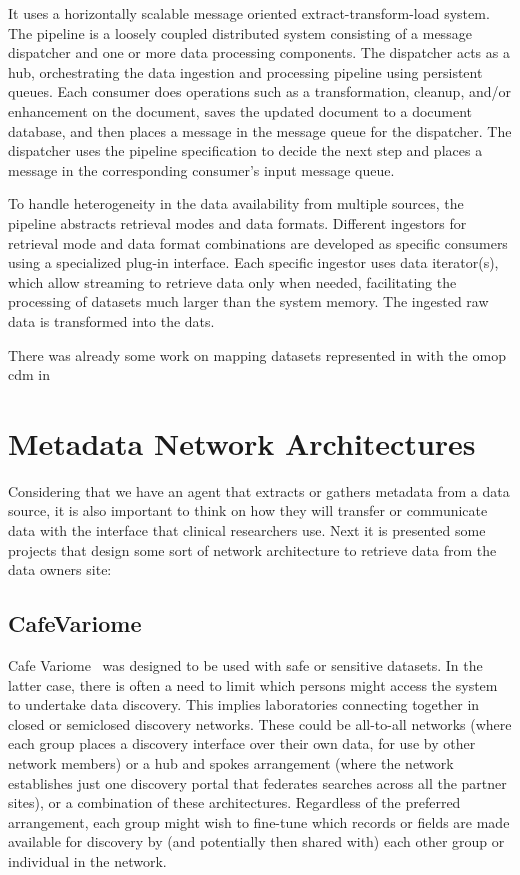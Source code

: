 It uses a horizontally scalable message oriented extract-transform-load system.
The pipeline is a loosely coupled distributed system consisting of a message dispatcher and one or more data processing components.
The dispatcher acts as a hub, orchestrating the data ingestion and processing pipeline using persistent queues.
Each consumer does operations such as a transformation, cleanup, and/or enhancement on the document, saves the updated document to a document database, and then places a message in the message queue for the dispatcher.
The dispatcher uses the pipeline specification to decide the next step and places a message in the corresponding consumer’s input message queue.

To handle heterogeneity in the data availability from multiple sources, the pipeline abstracts retrieval modes and data formats.
Different ingestors for retrieval mode and data format combinations are developed as specific consumers using a specialized plug-in interface.
Each specific ingestor uses data iterator(s), which allow streaming to retrieve data only when needed, facilitating the processing of datasets much larger than the system memory.
The ingested raw data is transformed into the \gls{dats}.

There was already some work on mapping datasets represented in with the \gls{omop} \gls{cdm} in \cite{cdm-dats}


\section{Metadata Network Architectures}  %

Considering that we have an agent that extracts or gathers metadata from a data source,
it is also important to think on how they will transfer or communicate data with the
interface that clinical researchers use.
Next it is presented some projects that design some sort of network architecture to
retrieve data from the data owners site:


\subsection*{CafeVariome}
Cafe Variome~\cite{cafevariome} was designed to be used with safe or sensitive datasets.
In the latter case, there is often a need to limit which persons might access the system to undertake data discovery.
This implies laboratories connecting together in closed or semiclosed discovery networks.
These could be all-to-all networks (where each group places a discovery interface over their own data, for use by other network members) or a hub and spokes arrangement (where the network establishes just one discovery portal that federates searches across all the partner sites), or a combination of these architectures.
Regardless of the preferred arrangement, each group might wish to fine-tune which records or fields are made available for discovery by (and potentially then shared with) each other group or individual in the network.

